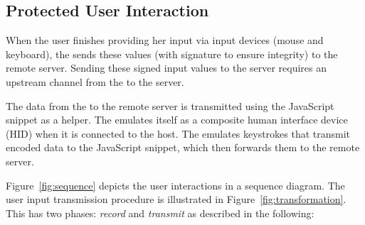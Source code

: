 \subsection{Protected User Interaction}
\label{sec:systemDesign:commit}

When the user finishes providing her input via input devices (mouse and keyboard), the \device sends these values (with signature to ensure integrity) to the remote server. Sending these signed input values to the server requires an upstream channel from the \device to the server. 

\parasave
{}\label{sec:systemDesign:commit:upload} 
The data from the \device to the remote server is transmitted using the \name JavaScript snippet as a helper. 
The \device emulates itself as a composite human interface device (HID) when it is connected to the host. The \device emulates keystrokes that transmit encoded data to the \name JavaScript snippet, which then forwards them to the remote server.

\parasave
{} Figure~\ref{fig:sequence} depicts the user interactions in a sequence diagram. The user input transmission procedure is illustrated in Figure~\ref{fig:transformation}. This has two phases: \emph{record} and \emph{transmit} as described in the following:

